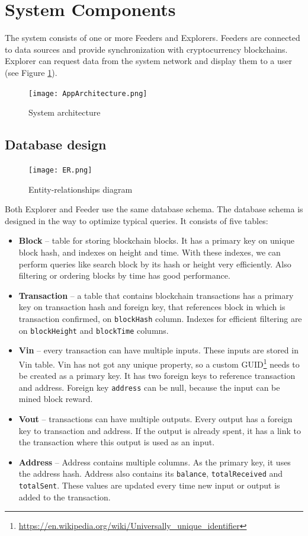 \section{System Components}
The system consists of one or more Feeders and Explorers. Feeders are connected to data sources and provide synchronization with cryptocurrency blockchains. Explorer can request data from the system network and display them to a user (see Figure \ref{systemArchitecture}).

\begin{figure}[h]
    \centering
    \texttt{[image: AppArchitecture.png]}
    \caption{System architecture}
    \label{systemArchitecture}
\end{figure}

\subsection{Database design}
\label{design}

\begin{figure}[h]
    \centering
    \texttt{[image: ER.png]}
    \caption{Entity-relationships diagram}
    \label{er}
\end{figure}

Both Explorer and Feeder use the same database schema. The database schema is designed in the way to optimize typical queries. It consists of five tables:
\begin{itemize}
    \item \textbf{Block} -- table for storing blockchain blocks. It has a primary key on unique block hash, and indexes on height and time. With these indexes, we can perform queries like search block by its hash or height very efficiently. Also filtering or ordering blocks by time has good performance.
    \item \textbf{Transaction} -- a table that contains blockchain transactions has a primary key on transaction hash and foreign key, that references block in which is transaction confirmed, on \texttt{blockHash} column. Indexes for efficient filtering are on \texttt{blockHeight} and \texttt{blockTime} columns. 
    \item \textbf{Vin} -- every transaction can have multiple inputs. These inputs are stored in Vin table. Vin has not got any unique property, so a custom GUID\footnote{\url{https://en.wikipedia.org/wiki/Universally_unique_identifier}} needs to be created as a primary key. It has two foreign keys to reference transaction and address. Foreign key \texttt{address} can be null, because the input can be mined block reward.
    \item \textbf{Vout} -- transactions can have multiple outputs. Every output has a foreign key to transaction and address. If the output is already spent, it has a link to the transaction where this output is used as an input.
    \item \textbf{Address} -- Address contains multiple columns. As the primary key, it uses the address hash. Address also contains its \texttt{balance}, \texttt{totalReceived} and \texttt{totalSent}. These values are updated every time new input or output is added to the transaction.  
\end{itemize}



